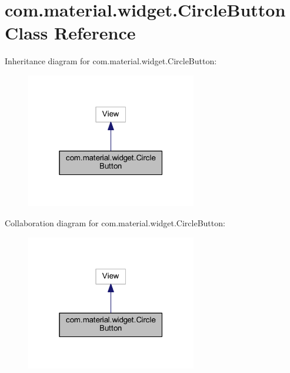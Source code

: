 \hypertarget{classcom_1_1material_1_1widget_1_1_circle_button}{}\section{com.\+material.\+widget.\+Circle\+Button Class Reference}
\label{classcom_1_1material_1_1widget_1_1_circle_button}


Inheritance diagram for com.\+material.\+widget.\+Circle\+Button\+:
\nopagebreak
\begin{figure}[H]
\begin{center}
\leavevmode
\includegraphics[width=211pt]{classcom_1_1material_1_1widget_1_1_circle_button__inherit__graph}
\end{center}
\end{figure}


Collaboration diagram for com.\+material.\+widget.\+Circle\+Button\+:
\nopagebreak
\begin{figure}[H]
\begin{center}
\leavevmode
\includegraphics[width=211pt]{classcom_1_1material_1_1widget_1_1_circle_button__coll__graph}
\end{center}
\end{figure}
